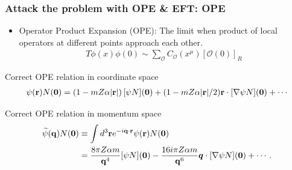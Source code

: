 \begin{frame}
  \frametitle{Attack the problem with OPE \& EFT: OPE}

  \begin{itemize}
    \item Operator Product Expansion (OPE): The limit when product of local operators at different points approach each other.
          \begin{align}
            T\phi(x)\phi(0)\sim\sum_{\mathcal{O}}C_{\mathcal{O}}(x^{\mu})[\mathcal{O}(0)]_R
          \end{align}
  \end{itemize}
  \onslide<+->
  \begin{block}{\large Correct OPE relation in coordinate space}
    \begin{align*}
      \psi({\bf r})N({\bf 0})=(1-mZ\alpha |{\bf r}|)\,[\psi N]({\bf 0})
      + (1-mZ\alpha |{\bf r}|/2){\bf r}\cdot [{\bf\nabla}\psi N]({\bf 0})+\cdots
    \end{align*}
  \end{block}

  \begin{block}{\large Correct OPE relation in momentum space}
    \begin{align*}
      \widetilde\psi({\bf q})N({\bf 0}) & \equiv \int d^3 {\bf r}
      e^{-i {\bf q}\cdot {\bf r}} \psi({\bf r})N({\bf 0})\nonumber \\&= \frac{8\pi Z\alpha m}{{\bf q}^4} [\psi N]({\bf 0})-\frac{16 i \pi Z\alpha m}{{\bf q}^6}\bm{q}
      \cdot [{\bf\nabla}\psi N] ({\bf 0})+\cdots.
    \end{align*}
  \end{block}
\end{frame}



